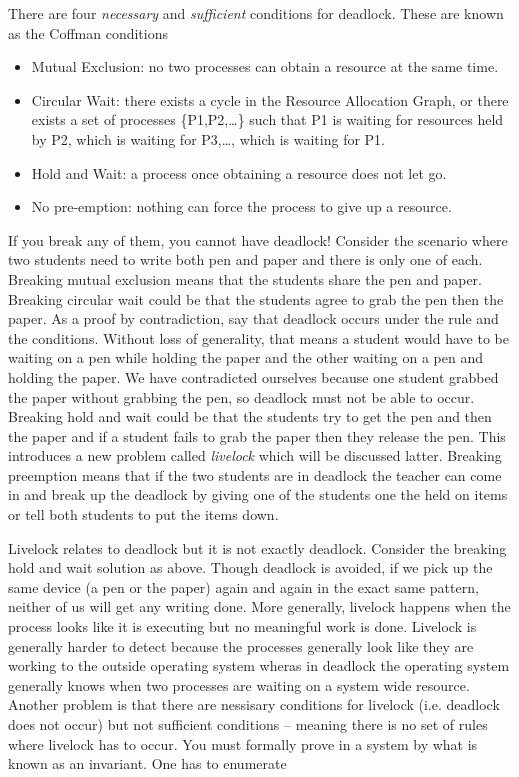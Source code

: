 There are four \emph{necessary} and \emph{sufficient} conditions for deadlock. These are known as the Coffman conditions \cite{CITATION_NEEDED}

\begin{itemize}
\tightlist
\item
  Mutual Exclusion: no two processes can obtain a resource at the same time.
\item
  Circular Wait: there exists a cycle in the Resource Allocation Graph, or there exists a set of processes \{P1,P2,\ldots{}\} such that P1 is waiting for resources held by P2, which is waiting for P3,\ldots{}, which is waiting for P1.
\item
  Hold and Wait: a process once obtaining a resource does not let go.
\item
  No pre-emption: nothing can force the process to give up a resource.
\end{itemize}

If you break any of them, you cannot have deadlock! Consider the scenario where two students need to write both pen and paper and there is only one of each. Breaking mutual exclusion means that the students share the pen and paper. Breaking circular wait could be that the students agree to grab the pen then the paper. As a proof by contradiction, say that deadlock occurs under the rule and the conditions. Without loss of generality, that means a student would have to be waiting on a pen while holding the paper and the other waiting on a pen and holding the paper. We have contradicted ourselves because one student grabbed the paper without grabbing the pen, so deadlock must not be able to occur. Breaking hold and wait could be that the students try to get the pen and then the paper and if a student fails to grab the paper then they release the pen. This introduces a new problem called \textit{livelock} which will be discussed latter. Breaking preemption means that if the two students are in deadlock the teacher can come in and break up the deadlock by giving one of the students one the held on items or tell both students to put the items down.

Livelock relates to deadlock but it is not exactly deadlock. Consider the breaking hold and wait solution as above. Though deadlock is avoided, if we pick up the same device (a pen or the paper) again and again in the exact same pattern, neither of us will get any writing done. More generally, livelock happens when the process looks like it is executing but no meaningful work is done. Livelock is generally harder to detect because the processes generally look like they are working to the outside operating system wheras in deadlock the operating system generally knows when two processes are waiting on a system wide resource. Another problem is that there are nessisary conditions for livelock (i.e. deadlock does not occur) but not sufficient conditions -- meaning there is no set of rules where livelock has to occur. You must formally prove in a system by what is known as an invariant. One has to enumerate

